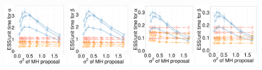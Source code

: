   \begin{figure}[H]
  \centering
  \begin{minipage}[h!]{0.99\linewidth}
  \centering
    \includegraphics [width=0.24\textwidth, angle=0]{figs/new_whole_exp_figs/cq_alpha_dim3.pdf}
    \includegraphics [width=0.24\textwidth, angle=0]{figs/new_whole_exp_figs/cq_beta_dim3.pdf}
    \includegraphics [width=0.24\textwidth, angle=0]{figs/new_whole_exp_figs/cq_alpha_dim10.pdf}
    \includegraphics [width=0.24\textwidth, angle=0]{figs/new_whole_exp_figs/cq_beta_dim10.pdf}
  \end{minipage}


\end{figure}

